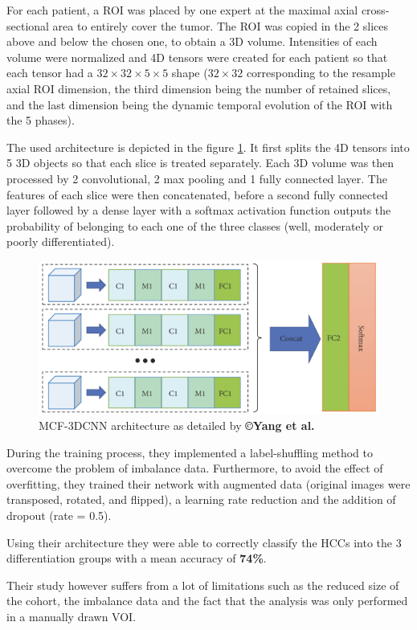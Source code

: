 \documentclass[]{article}
\begin{document}
For each patient, a ROI was placed by one expert at the maximal axial
cross-sectional area to entirely cover the tumor. The ROI was
copied in the 2 slices above and below the chosen one, to obtain a 3D
volume. Intensities of each volume were normalized and 4D tensors were
created for each patient so that each tensor had a $ 32\times32\times5\times5 $ shape
($ 32\times32 $ corresponding to the resample axial ROI dimension, the third
dimension being the number of retained slices, and the last dimension being the
dynamic temporal evolution of the ROI with the 5 phases).

The used architecture is depicted in the figure \ref{fig:Yang2019_Figure2_MCF-3DCNN}. It first splits the 4D
tensors into 5 3D objects so that each slice is treated separately. Each
3D volume was then processed by 2 convolutional, 2 max pooling and 1
fully connected layer. The features of each slice were then
concatenated, before a second fully connected layer followed by a dense
layer with a softmax activation function outputs the probability of
belonging to each one of the three classes (well, moderately or poorly differentiated).

\begin{figure}[th!]
\centering
\includegraphics[width=0.7\linewidth]{images/Yang2019_Fig2}
\caption{MCF-3DCNN architecture as detailed by \textbf{©Yang et al. \cite{Yang2019}}}
\label{fig:Yang2019_Figure2_MCF-3DCNN}
\end{figure}


During the training process, they implemented a label-shuffling method
to overcome the problem of imbalance data. Furthermore, to avoid the
effect of overfitting, they trained their network with augmented data
(original images were transposed, rotated, and flipped), a learning rate
reduction and the addition of dropout (rate = 0.5).

Using their architecture they were able to correctly classify the HCCs
into the 3 differentiation groups with a mean accuracy of \textbf{74\%}.


Their study however suffers from a lot of limitations such as the
reduced size of the cohort, the imbalance data and the fact that the
analysis was only performed in a manually drawn VOI.
\end{document}
